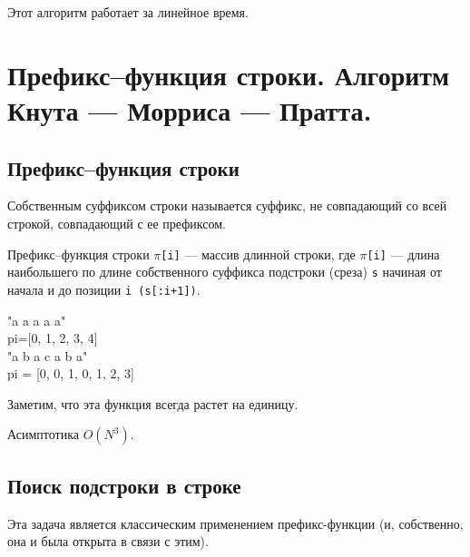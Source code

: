Этот алгоритм работает за линейное время.
\section{Префикс--функция строки. Алгоритм Кнута — Морриса — Пратта.}
\subsection{Префикс--функция строки}
Собственным суффиксом строки называется суффикс, не совпадающий со всей строкой, совпадающий с ее префиксом. 

Префикс--функция строки \texttt{$\pi$[i]} --- массив длинной строки, где \texttt{$\pi$[i]} --- длина наибольшего по длине собственного суффикса подстроки (среза) \texttt{s} начиная от начала и до позиции \texttt{i (s[:i+1])}.
\begin{center}
"a a a a a"\\
pi=[0, 1, 2, 3, 4]\\
"a b a c a b a"\\
pi = [0, 0, 1, 0, 1, 2, 3]\\
\end{center}
Заметим, что эта функция всегда растет на единицу.
Асимптотика $O(N^3)$.


\subsection{Поиск подстроки в строке}
Эта задача является классическим применением префикс-функции (и, собственно, она и была открыта в связи с этим).

